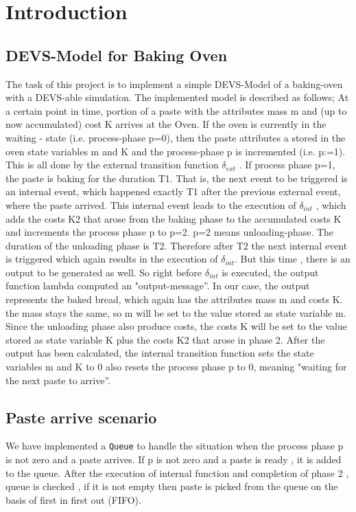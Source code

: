 \documentclass[titlepage]{report}%
\begin{document}
\chapter{Introduction}

\section{DEVS-Model for Baking Oven}

The task of this project is to implement a simple DEVS-Model of a baking-oven with a DEVS-able simulation. The implemented model is described as follows;
At a certain point in time, portion of a paste with the attributes mass m and (up to now accumulated) cost K arrives at the Oven. If the oven is currently in the waiting - state (i.e. process-phase p=0), then the paste attributes a stored in the oven state variables m and K and the process-phase p is incremented (i.e. p:=1). This is all done by the external transition function $\delta_{ext}$ . If process phase p=1, the paste is baking for the duration T1. That is, the next event to be triggered is an internal event, which happened exactly T1 after the previous external event, where the paste arrived. This internal event leads to the execution of  $\delta_{int}$ , which adds the costs K2 that arose from the baking phase to the accumulated costs K and increments the process phase p to p=2. p=2 means unloading-phase. The duration of the unloading phase is T2. Therefore after T2 the next internal event is triggered which again results in the execution of $\delta_{int}$. But this time , there is an output to be generated as well. So right before $\delta_{int}$ is executed, the output function lambda computed an "output-message''. In our case, the output represents the baked bread, which again has the attributes mass m and costs K. the mass stays the same, so m will be set to the value stored as state variable m. Since the unloading phase also produce costs, the costs K will be set to the value stored as state variable K plus the costs K2 that arose in phase 2. After the output has been calculated, the internal transition function sets the state variables m and K to 0 also resets the process phase p to 0, meaning "waiting for the next paste to arrive''. 

\section{Paste arrive scenario}
We have implemented a \texttt{Queue} to handle the situation when the process phase p is not zero and a paste arrives. If p is not zero and a paste is ready , it is added to the queue. After the execution of internal function and completion of phase 2 , queue is checked , if it is not empty then paste is picked from the queue on the basis of first in first out (FIFO). 
\end{document}
